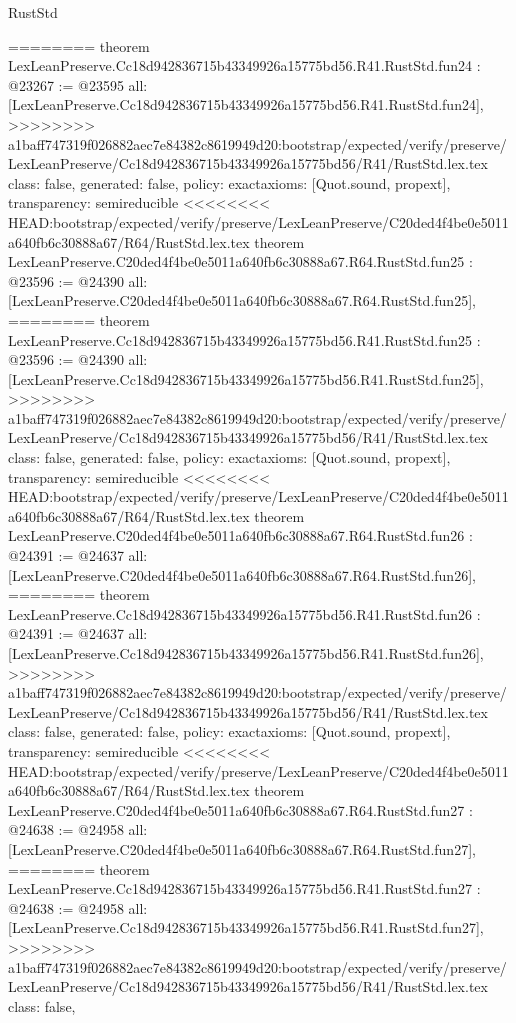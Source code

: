 \begin{lexlean}{RustStd}
\begin{coremodule}
{\begin{coremodule}
{{{{{{{{{{{{{{{{{{{{{{{{{{{========
theorem LexLeanPreserve.Cc18d942836715b43349926a15775bd56.R41.RustStd.fun24 : @23267 := @23595 {
  all: [LexLeanPreserve.Cc18d942836715b43349926a15775bd56.R41.RustStd.fun24],
>>>>>>>> a1baff747319f026882aec7e84382c8619949d20:bootstrap/expected/verify/preserve/LexLeanPreserve/Cc18d942836715b43349926a15775bd56/R41/RustStd.lex.tex
  class: false,
  generated: false,
  policy: exact{axioms: [Quot.sound, propext]},
  transparency: semireducible
}
<<<<<<<< HEAD:bootstrap/expected/verify/preserve/LexLeanPreserve/C20ded4f4be0e5011a640fb6c30888a67/R64/RustStd.lex.tex
theorem LexLeanPreserve.C20ded4f4be0e5011a640fb6c30888a67.R64.RustStd.fun25 : @23596 := @24390 {
  all: [LexLeanPreserve.C20ded4f4be0e5011a640fb6c30888a67.R64.RustStd.fun25],
========
theorem LexLeanPreserve.Cc18d942836715b43349926a15775bd56.R41.RustStd.fun25 : @23596 := @24390 {
  all: [LexLeanPreserve.Cc18d942836715b43349926a15775bd56.R41.RustStd.fun25],
>>>>>>>> a1baff747319f026882aec7e84382c8619949d20:bootstrap/expected/verify/preserve/LexLeanPreserve/Cc18d942836715b43349926a15775bd56/R41/RustStd.lex.tex
  class: false,
  generated: false,
  policy: exact{axioms: [Quot.sound, propext]},
  transparency: semireducible
}
<<<<<<<< HEAD:bootstrap/expected/verify/preserve/LexLeanPreserve/C20ded4f4be0e5011a640fb6c30888a67/R64/RustStd.lex.tex
theorem LexLeanPreserve.C20ded4f4be0e5011a640fb6c30888a67.R64.RustStd.fun26 : @24391 := @24637 {
  all: [LexLeanPreserve.C20ded4f4be0e5011a640fb6c30888a67.R64.RustStd.fun26],
========
theorem LexLeanPreserve.Cc18d942836715b43349926a15775bd56.R41.RustStd.fun26 : @24391 := @24637 {
  all: [LexLeanPreserve.Cc18d942836715b43349926a15775bd56.R41.RustStd.fun26],
>>>>>>>> a1baff747319f026882aec7e84382c8619949d20:bootstrap/expected/verify/preserve/LexLeanPreserve/Cc18d942836715b43349926a15775bd56/R41/RustStd.lex.tex
  class: false,
  generated: false,
  policy: exact{axioms: [Quot.sound, propext]},
  transparency: semireducible
}
<<<<<<<< HEAD:bootstrap/expected/verify/preserve/LexLeanPreserve/C20ded4f4be0e5011a640fb6c30888a67/R64/RustStd.lex.tex
theorem LexLeanPreserve.C20ded4f4be0e5011a640fb6c30888a67.R64.RustStd.fun27 : @24638 := @24958 {
  all: [LexLeanPreserve.C20ded4f4be0e5011a640fb6c30888a67.R64.RustStd.fun27],
========
theorem LexLeanPreserve.Cc18d942836715b43349926a15775bd56.R41.RustStd.fun27 : @24638 := @24958 {
  all: [LexLeanPreserve.Cc18d942836715b43349926a15775bd56.R41.RustStd.fun27],
>>>>>>>> a1baff747319f026882aec7e84382c8619949d20:bootstrap/expected/verify/preserve/LexLeanPreserve/Cc18d942836715b43349926a15775bd56/R41/RustStd.lex.tex
  class: false,
}}}}}}}}}}}}}}}}}}}}}}}}}}}}}}}
\end{coremodule}}
\end{coremodule}
\end{lexlean}

